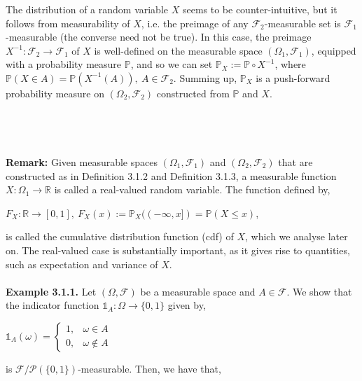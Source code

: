 \documentclass{article}
\begin{document}
The distribution of a random variable $X$ seems to be counter-intuitive, but it follows from measurability of $X$, i.e. the preimage of any $\mathcal{F}_2$-measurable set is $\mathcal{F}_1$-measurable (the converse need not be true). In this case, the preimage $X^{-1}: \mathcal{F}_2 \to \mathcal{F}_1$ of $X$ is well-defined on the measurable space $(\Omega_1,\mathcal{F}_1)$, equipped with a probability measure $\mathbb{P}$, and so we can set $\mathbb{P}_X := \mathbb{P} \circ X^{-1}$, where $\mathbb{P}(X \in A) = \mathbb{P}(X^{-1}(A)), \ A \in \mathcal{F}_2$. Summing up, $\mathbb{P}_X$ is a push-forward probability measure on $(\Omega_2,\mathcal{F}_2)$ constructed from $\mathbb{P}$ and $X$.\\\\
\noindent{}\\\\\\
\textbf{Remark:} Given measurable spaces $(\Omega_1,\mathcal{F}_1)$ and $(\Omega_2,\mathcal{F}_2)$ that are constructed as in Definition 3.1.2 and Definition 3.1.3, a measurable function $X: \Omega_1 \to \mathbb{R}$ is called a real-valued random variable. The function defined by,
\begin{center}
	$F_X: \mathbb{R} \to [0,1], \ F_X(x) := \mathbb{P}_X((-\infty, x]) = \mathbb{P}(X \leq x)$,
\end{center}
is called the cumulative distribution function (cdf) of $X$, which we analyse later on. The real-valued case is substantially important, as it gives rise to quantities, such as expectation and variance of $X$.\\\\
\textbf{Example 3.1.1.} Let $(\Omega,\mathcal{F})$ be a measurable space and $A \in \mathcal{F}$. We show that the indicator function $\mathds{1}_A : \Omega \to \{0,1\}$ given by,
\begin{center}
$\mathds{1}_A(\omega) =
\begin{cases}
1, & \omega \in A\\
0, & \omega \notin A
\end{cases}$
\end{center}
is $\mathcal{F}/\mathcal{P}(\{0,1\})$-measurable. Then, we have that,
\end{document}
